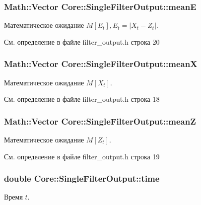 \subsubsection[{\texorpdfstring{meanE}{meanE}}]{\setlength{\rightskip}{0pt plus 5cm}Math\+::\+Vector Core\+::\+Single\+Filter\+Output\+::meanE}\hypertarget{struct_core_1_1_single_filter_output_ab8e09d89fe2c1bb1577242e950998c10}{}\label{struct_core_1_1_single_filter_output_ab8e09d89fe2c1bb1577242e950998c10}
Математическое ожидание $M[E_t], E_t = |X_t - Z_t|$. 

См. определение в файле filter\+\_\+output.\+h строка 20

\subsubsection[{\texorpdfstring{meanX}{meanX}}]{\setlength{\rightskip}{0pt plus 5cm}Math\+::\+Vector Core\+::\+Single\+Filter\+Output\+::meanX}\hypertarget{struct_core_1_1_single_filter_output_aa06ff31e25433b19e09b67b290a187ca}{}\label{struct_core_1_1_single_filter_output_aa06ff31e25433b19e09b67b290a187ca}
Математическое ожидание $M[X_t]$. 

См. определение в файле filter\+\_\+output.\+h строка 18

\subsubsection[{\texorpdfstring{meanZ}{meanZ}}]{\setlength{\rightskip}{0pt plus 5cm}Math\+::\+Vector Core\+::\+Single\+Filter\+Output\+::meanZ}\hypertarget{struct_core_1_1_single_filter_output_aa2350a5b96ca5ef7cdb056e091702b5d}{}\label{struct_core_1_1_single_filter_output_aa2350a5b96ca5ef7cdb056e091702b5d}
Математическое ожидание $M[Z_t]$. 

См. определение в файле filter\+\_\+output.\+h строка 19

\subsubsection[{\texorpdfstring{time}{time}}]{\setlength{\rightskip}{0pt plus 5cm}double Core\+::\+Single\+Filter\+Output\+::time}\hypertarget{struct_core_1_1_single_filter_output_a4d2078c50b021df0d91e862d55619637}{}\label{struct_core_1_1_single_filter_output_a4d2078c50b021df0d91e862d55619637}
Время $t$. 

